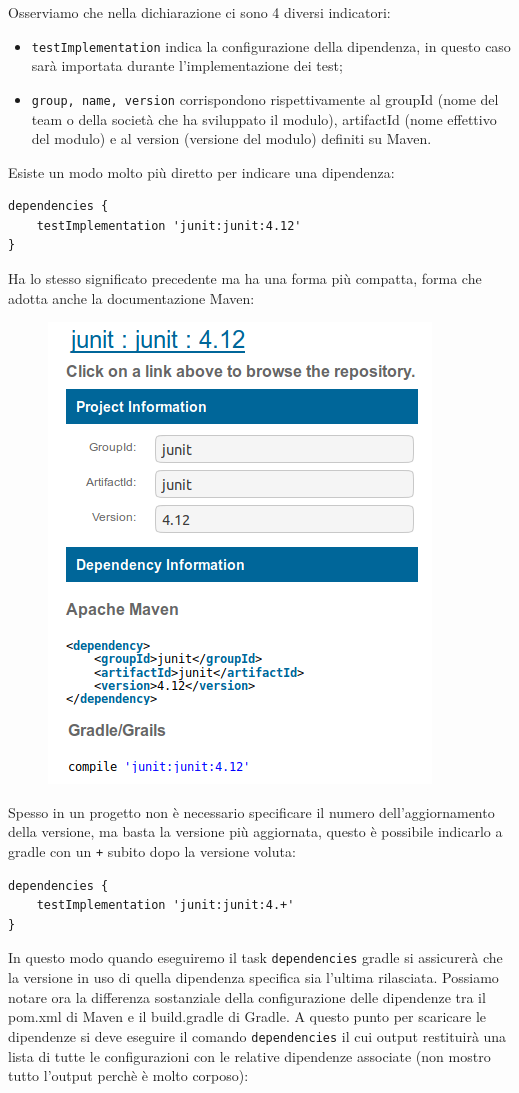 Osserviamo che nella dichiarazione ci sono 4 diversi indicatori:
\begin{itemize}
    \item \texttt{testImplementation} indica la configurazione della dipendenza, in questo caso sarà importata durante l'implementazione dei test;
    \item \texttt{group, name, version} corrispondono rispettivamente al groupId (nome del team o della società che ha sviluppato il modulo), artifactId (nome effettivo del modulo) e al version (versione del modulo) definiti su Maven.
\end{itemize}
Esiste un modo molto più diretto per indicare una dipendenza:
\begin{lstlisting}[frame=single]
dependencies {
    testImplementation 'junit:junit:4.12'
} \end{lstlisting}
Ha lo stesso significato precedente ma ha una forma più compatta, forma che adotta anche la documentazione Maven:
\begin{figure}[H]
\centering
\includegraphics[width=0.4\linewidth]{3DependencyManagement/javaDep/gradleInMavenRepo.png}
\end{figure}
Spesso in un progetto non è necessario specificare il numero dell'aggiornamento della versione, ma basta la versione più aggiornata, questo è possibile indicarlo a gradle con un \texttt{+} subito dopo la versione voluta:
\begin{lstlisting}[frame=single]
dependencies {
    testImplementation 'junit:junit:4.+'
} \end{lstlisting}
In questo modo quando eseguiremo il task \texttt{dependencies} gradle si assicurerà che la versione in uso di quella dipendenza specifica sia l'ultima rilasciata. Possiamo notare ora la differenza sostanziale della configurazione delle dipendenze tra il pom.xml di Maven e il build.gradle di Gradle. A questo punto per scaricare le dipendenze si deve eseguire il comando \texttt{dependencies} il cui output restituirà una lista di tutte le configurazioni con le relative dipendenze associate (non mostro tutto l'output perchè è molto corposo):
